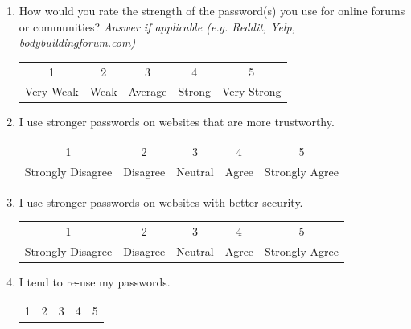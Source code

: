 \documentclass[letterpaper, 10 pt, conference]{ieeeconf}  %
\begin{document}
\begin{enumerate}
    \newpage{}
    
    \item How would you rate the strength of the password(s) you use for online forums or communities? \textit{Answer if applicable (e.g. Reddit, Yelp, bodybuildingforum.com)}
        \begin{table}[!htbp]
        \begin{center}
        \begin{tabular}{ccccc}
        1                 & 2        & 3       & 4     & 5              \\
        Very Weak & Weak & Average & Strong & Very Strong
        \end{tabular}
        \end{center}
        \end{table}
    \item I use stronger passwords on websites that are more trustworthy.
        \begin{table}[!htbp]
        \begin{center}
        \begin{tabular}{ccccc}
        1                 & 2        & 3       & 4     & 5              \\
        Strongly Disagree & Disagree & Neutral & Agree & Strongly Agree
        \end{tabular}
        \end{center}
        \end{table}
    \item I use stronger passwords on websites with better security.
        \begin{table}[!htbp]
        \begin{center}
        \begin{tabular}{ccccc}
        1                 & 2        & 3       & 4     & 5              \\
        Strongly Disagree & Disagree & Neutral & Agree & Strongly Agree
        \end{tabular}
        \end{center}
        \end{table}
    \item I tend to re-use my passwords.
        \begin{table}[!htbp]
        \begin{center}
        \begin{tabular}{ccccc}
        1                 & 2        & 3       & 4     & 5              \\

\end{tabular}
\end{center}
\end{table}
\end{enumerate}
\end{document}
